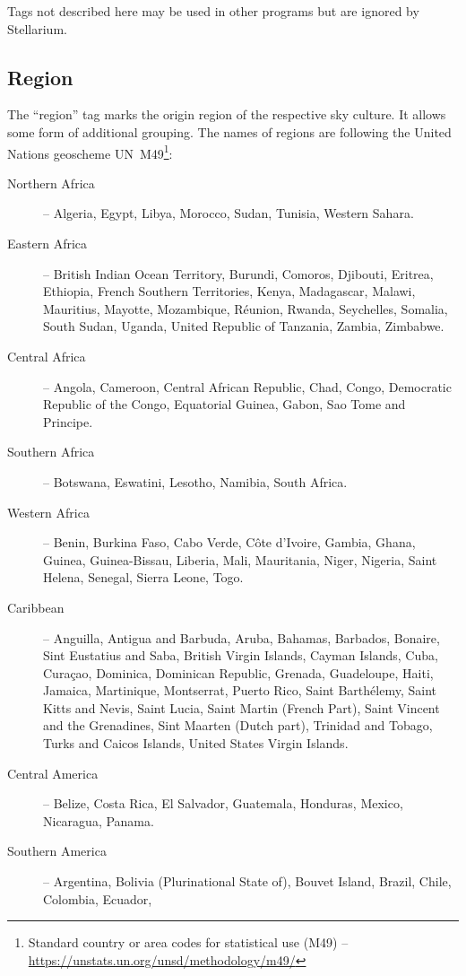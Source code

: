 Tags not described here may be used in other programs but are ignored by Stellarium.

\subsection{Region}
\label{sec:skycultures:region}
\label{SC:region}

The ``region'' tag marks the origin region of the respective sky culture.
It allows some form of additional grouping. The names of regions are following the United Nations
geoscheme UN~M49\footnote{Standard country or area codes for statistical use (M49) -- \url{https://unstats.un.org/unsd/methodology/m49/}}:
\begin{description}
	\item[Northern Africa] -- Algeria, Egypt, Libya, Morocco, Sudan, Tunisia, Western Sahara.
	\item[Eastern Africa] -- British Indian Ocean Territory, Burundi, Comoros, Djibouti, Eritrea, Ethiopia, French Southern Territories, Kenya,
          Madagascar, Malawi, Mauritius, Mayotte, Mozambique, Réunion, Rwanda, Seychelles, Somalia, South Sudan, Uganda, United Republic of Tanzania, Zambia, Zimbabwe.
	\item[Central Africa] -- Angola, Cameroon, Central African Republic, Chad, Congo, Democratic Republic of the Congo, Equatorial Guinea, Gabon, Sao Tome and Principe.
	\item[Southern Africa] -- Botswana, Eswatini, Lesotho, Namibia, South Africa.
	\item[Western Africa] -- Benin, Burkina Faso, Cabo Verde, Côte d’Ivoire, Gambia, Ghana, Guinea, Guinea-Bissau, Liberia,
          Mali, Mauritania, Niger, Nigeria, Saint Helena, Senegal, Sierra Leone, Togo.
	\item[Caribbean] -- Anguilla, Antigua and Barbuda, Aruba, Bahamas, Barbados, Bonaire, Sint Eustatius and Saba, British Virgin Islands,
          Cayman Islands, Cuba, Curaçao, Dominica, Dominican Republic, Grenada, Guadeloupe, Haiti, Jamaica, Martinique, Montserrat, Puerto Rico, Saint Barthélemy,
          Saint Kitts and Nevis, Saint Lucia, Saint Martin (French Part), Saint Vincent and the Grenadines, Sint Maarten (Dutch part),
          Trinidad and Tobago, Turks and Caicos Islands, United States Virgin Islands.
	\item[Central America] -- Belize, Costa Rica, El Salvador, Guatemala, Honduras, Mexico, Nicaragua, Panama.
	\item[Southern America] -- Argentina, Bolivia (Plurinational State of), Bouvet Island, Brazil, Chile, Colombia, Ecuador,

\end{description}
